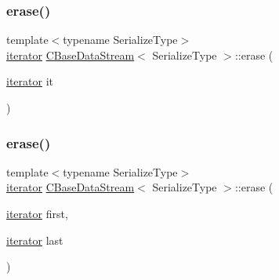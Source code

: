 \mbox{\label{class_c_base_data_stream_ae381ee24932de8d08ebe13b4e1078e39}} 
\subsubsection{\texorpdfstring{erase()}{erase()}\hspace{0.1cm}{\footnotesize\ttfamily [1/2]}}
{\footnotesize\ttfamily template$<$typename Serialize\+Type$>$ \\
\mbox{\hyperlink{class_c_base_data_stream_a23e0e0af1c68dd36c27162036b6d048d}{iterator}} \mbox{\hyperlink{class_c_base_data_stream}{C\+Base\+Data\+Stream}}$<$ Serialize\+Type $>$\+::erase (\begin{DoxyParamCaption}\item[{\mbox{\hyperlink{class_c_base_data_stream_a23e0e0af1c68dd36c27162036b6d048d}{iterator}}}]{it }\end{DoxyParamCaption})\hspace{0.3cm}{\ttfamily [inline]}}

\mbox{\label{class_c_base_data_stream_a0fb5434f391056c30493ccc39f7eeb24}} 
\subsubsection{\texorpdfstring{erase()}{erase()}\hspace{0.1cm}{\footnotesize\ttfamily [2/2]}}
{\footnotesize\ttfamily template$<$typename Serialize\+Type$>$ \\
\mbox{\hyperlink{class_c_base_data_stream_a23e0e0af1c68dd36c27162036b6d048d}{iterator}} \mbox{\hyperlink{class_c_base_data_stream}{C\+Base\+Data\+Stream}}$<$ Serialize\+Type $>$\+::erase (\begin{DoxyParamCaption}\item[{\mbox{\hyperlink{class_c_base_data_stream_a23e0e0af1c68dd36c27162036b6d048d}{iterator}}}]{first,  }\item[{\mbox{\hyperlink{class_c_base_data_stream_a23e0e0af1c68dd36c27162036b6d048d}{iterator}}}]{last }\end{DoxyParamCaption})\hspace{0.3cm}{\ttfamily [inline]}}

